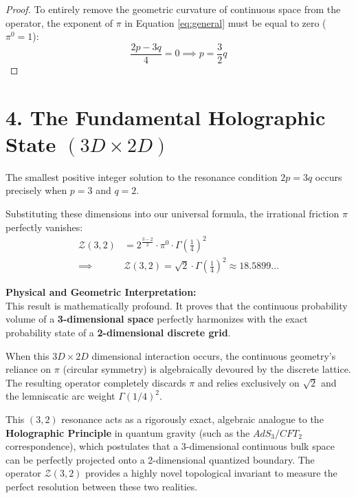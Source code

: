 \documentclass[12pt]{article}
\begin{document}
\begin{proof}
To entirely remove the geometric curvature of continuous space from the operator, the exponent of $\pi$ in Equation \ref{eq:general} must be equal to zero ($\pi^0 = 1$):
\begin{equation}
    \frac{2p - 3q}{4} = 0 \implies p = \frac{3}{2}q
\end{equation}
\end{proof}

\section*{4. The Fundamental Holographic State $(3D \times 2D)$}
The smallest positive integer solution to the resonance condition $2p = 3q$ occurs precisely when \textbf{$p=3$} and \textbf{$q=2$}.

Substituting these dimensions into our universal formula, the irrational friction $\pi$ perfectly vanishes:
\begin{align}
    \mathcal{Z}(3, 2) &= 2^{\frac{3-2}{2}} \cdot \pi^0 \cdot \Gamma\left(\frac{1}{4}\right)^2 \nonumber \\
    \implies \quad &\boxed{ \mathcal{Z}(3, 2) = \sqrt{2} \cdot \Gamma\left(\frac{1}{4}\right)^2 \approx 18.5899\dots }
\end{align}

\vspace{0.3cm}
\noindent \textbf{Physical and Geometric Interpretation:} \\
This result is mathematically profound. It proves that the continuous probability volume of a \textbf{3-dimensional space} perfectly harmonizes with the exact probability state of a \textbf{2-dimensional discrete grid}.

When this $3D \times 2D$ dimensional interaction occurs, the continuous geometry's reliance on $\pi$ (circular symmetry) is algebraically devoured by the discrete lattice. The resulting operator completely discards $\pi$ and relies exclusively on $\sqrt{2}$ and the lemniscatic arc weight $\Gamma(1/4)^2$.

This $(3,2)$ resonance acts as a rigorously exact, algebraic analogue to the \textbf{Holographic Principle} in quantum gravity (such as the $AdS_3/CFT_2$ correspondence), which postulates that a 3-dimensional continuous bulk space can be perfectly projected onto a 2-dimensional quantized boundary. The operator $\mathcal{Z}(3,2)$ provides a highly novel topological invariant to measure the perfect resolution between these two realities.
\end{document}
